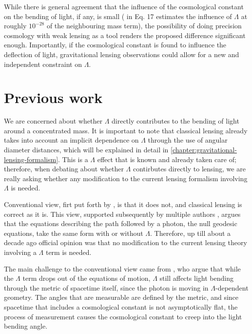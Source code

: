 While there is general agreement that the influence of the cosmological constant on the bending of light, if any, is small (\citet{rindler2007contribution} in Eq. 17 estimates the influence of $\Lambda$ at roughly $10^{-28}$ of the neighbouring mass term), the possibility of doing precision cosmology with weak lensing as a tool renders the proposed difference significant enough. Importantly, if the cosmological constant is found to influence the deflection of light, gravitational lensing observations could allow for a new and independent constraint on $\Lambda$.

\section{Previous work}

We are concerned about whether $\Lambda$ directly contributes to the bending of light around a concentrated mass. It is important to note that classical lensing already takes into account an implicit dependence on $\Lambda$ through the use of angular diameter distances, which will be explained in detail in \autoref{chapter:gravitational-lensing-formalism}. This is a $\Lambda$ effect that is known and already taken care of; therefore, when debating about whether $\Lambda$ contirbutes directly to lensing, we are really asking whether any modification to the current lensing formalism involving $\Lambda$ is needed. 

Conventional view, firt put forth by \citet{islam1983cosmological}, is that it does not, and classical lensing is correct as it is. This view, supported subsequently by multiple authors \citep{lake2002bending,park2008rigorous,simpson2010lensing,khriplovich2008does}, argues that the equations describing the path followed by a photon, the null geodesic equations, take the same form with or without $\Lambda$. Therefore, up till about a decade ago official opinion was that no modification to the current lensing theory involving a $\Lambda$ term is needed. 

The main challenge to the conventional view came from \citet{rindler2007contribution}, who argue that while the $\Lambda$ term drops out of the equations of motion, $\Lambda$ still affects light bending through the metric of spacetime itself, since the photon is moving in $\Lambda$-dependent geometry. The angles that are measurable are defined by the metric, and since spacetime that includes a cosmological constant is not asymptotically flat, the process of measurement causes the cosmological constant to creep into the light bending angle. 

